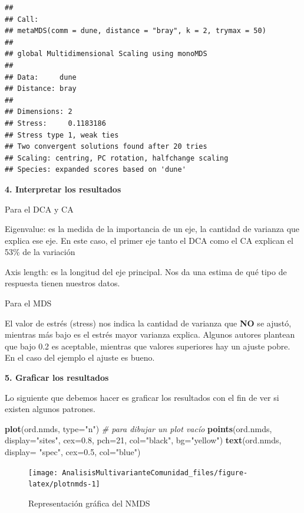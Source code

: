\documentclass[]{book}
\newenvironment{Shaded}{\begin{snugshade}}{\end{snugshade}}
\newcommand{\KeywordTok}[1]{\textcolor[rgb]{0.13,0.29,0.53}{\textbf{{#1}}}}
\newcommand{\DataTypeTok}[1]{\textcolor[rgb]{0.13,0.29,0.53}{{#1}}}
\newcommand{\DecValTok}[1]{\textcolor[rgb]{0.00,0.00,0.81}{{#1}}}
\newcommand{\FloatTok}[1]{\textcolor[rgb]{0.00,0.00,0.81}{{#1}}}
\newcommand{\StringTok}[1]{\textcolor[rgb]{0.31,0.60,0.02}{{#1}}}
\newcommand{\CommentTok}[1]{\textcolor[rgb]{0.56,0.35,0.01}{\textit{{#1}}}}
\newcommand{\NormalTok}[1]{{#1}}
\begin{document}
\begin{verbatim}
## 
## Call:
## metaMDS(comm = dune, distance = "bray", k = 2, trymax = 50) 
## 
## global Multidimensional Scaling using monoMDS
## 
## Data:     dune 
## Distance: bray 
## 
## Dimensions: 2 
## Stress:     0.1183186 
## Stress type 1, weak ties
## Two convergent solutions found after 20 tries
## Scaling: centring, PC rotation, halfchange scaling 
## Species: expanded scores based on 'dune'
\end{verbatim}

\textbf{4. Interpretar los resultados}

Para el DCA y CA

Eigenvalue: es la medida de la importancia de un eje, la cantidad de
varianza que explica ese eje. En este caso, el primer eje tanto el DCA
como el CA explican el 53\% de la variación

Axis length: es la longitud del eje principal. Nos da una estima de qué
tipo de respuesta tienen nuestros datos.

Para el MDS

El valor de estrés (stress) nos indica la cantidad de varianza que
\textbf{NO} se ajustó, mientras más bajo es el estrés mayor varianza
explica. Algunos autores plantean que bajo 0.2 es aceptable, mientras
que valores superiores hay un ajuste pobre. En el caso del ejemplo el
ajuste es bueno.

\textbf{5. Graficar los resultados}

Lo siguiente que debemos hacer es graficar los resultados con el fin de
ver si existen algunos patrones.

\begin{Shaded}
\begin{Highlighting}[]
\KeywordTok{plot}\NormalTok{(ord.nmds, }\DataTypeTok{type=}\StringTok{"n"}\NormalTok{)  }\CommentTok{# para dibujar un plot vacío}
\KeywordTok{points}\NormalTok{(ord.nmds, }\DataTypeTok{display=}\StringTok{"sites"}\NormalTok{, }\DataTypeTok{cex=}\FloatTok{0.8}\NormalTok{, }\DataTypeTok{pch=}\DecValTok{21}\NormalTok{, }\DataTypeTok{col=}\StringTok{"black"}\NormalTok{, }\DataTypeTok{bg=}\StringTok{"yellow"}\NormalTok{)  }
\KeywordTok{text}\NormalTok{(ord.nmds, }\DataTypeTok{display=} \StringTok{"spec"}\NormalTok{, }\DataTypeTok{cex=}\FloatTok{0.5}\NormalTok{, }\DataTypeTok{col=}\StringTok{"blue"}\NormalTok{) }
\end{Highlighting}
\end{Shaded}

\begin{figure}

{\centering \texttt{[image: AnalisisMultivarianteComunidad\_files/figure-latex/plotnmds-1]} 

}

\caption{Representación gráfica del NMDS}\label{fig:plotnmds}
\end{figure}
\end{document}
